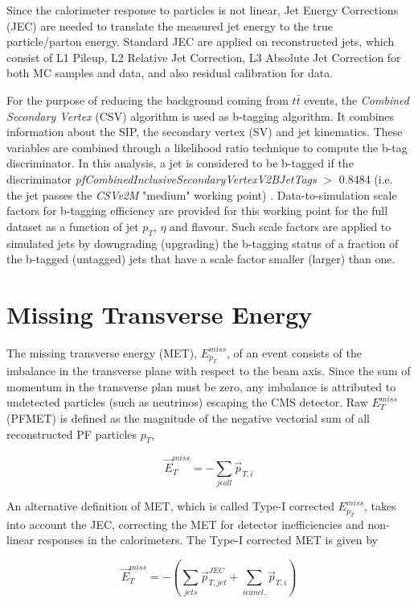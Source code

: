Since the calorimeter response to particles is not linear, Jet Energy Corrections (JEC) are needed to translate the measured jet energy to the true particle/parton energy. Standard JEC are applied on reconstructed jets, which consist of L1 Pileup, L2 Relative Jet Correction, L3 Absolute Jet Correction for both MC samples and data, and also residual calibration for data.

For the purpose of reducing the background coming from $t\bar{t}$ events, the \textit{Combined Secondary Vertex} (CSV) algorithm is used as b-tagging algorithm. It combines information about the SIP, the secondary vertex (SV) and jet kinematics. These variables are combined through a likelihood ratio technique to compute the b-tag discriminator. In this analysis, a jet is considered to be b-tagged if the discriminator \textit{pfCombinedInclusiveSecondaryVertexV2BJetTags} $>$ 0.8484 (i.e. the jet passes the \textit{CSVv2M} "medium" working point) \cite{bib:CMS-AN-15-277,bib:CMS-AN-16-442}. Data-to-simulation scale factors for b-tagging efficiency are provided for this working point for the full dataset as a function of jet $p_{T}$, $\eta$ and flavour. Such scale factors are applied to simulated jets by downgrading (upgrading) the b-tagging status of a fraction of the b-tagged (untagged) jets that have a scale factor smaller (larger) than one.

\section{Missing Transverse Energy}
The missing transverse energy (MET), $E_{p_{T}}^{miss}$, of an event
consists of the imbalance in the transverse plane with respect to the beam axis. Since the sum of momentum in the transverse plan must be zero, any imbalance is attributed to undetected particles (such as neutrinos) escaping the CMS detector. Raw $E_{T}^{miss}$ (PFMET) is defined as the magnitude of the negative vectorial sum of all reconstructed PF particles $p_{T}$,

\begin{equation}
\vec{E}_{T}^{miss} = - \sum_{j\epsilon all} \vec{p}_{T,i}
\end{equation}

An alternative definition of MET, which is called Type-I corrected $E_{p_{T}}^{miss}$, takes into account the JEC, correcting the MET for detector inefficiencies and non-linear responses in the calorimeters. The Type-I corrected MET is given by

\begin{equation}
\vec{E}_{T}^{miss} = - \left( \sum_{jets} \vec{p}_{T,jet}^{JEC} + \sum_{i \epsilon uncl.} \vec{p}_{T,i} \right)
\end{equation}

